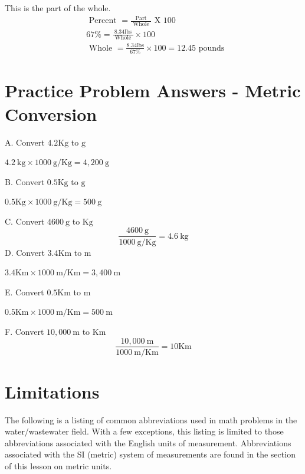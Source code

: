 \documentclass[10pt]{article}
\begin{document}
This is the part of the whole.
$$
\begin{aligned}
&\text { Percent }=\frac{\text { Part }}{\text { Whole }} \text { X } 100 \\
&67 \%=\frac{8.34 \mathrm{lbs}}{\text { Whole }} \times 100 \\
&\text { Whole }=\frac{8.34 \mathrm{lbs}}{67 \%} \times 100=12.45 \text { pounds }
\end{aligned}
$$

\section{Practice Problem Answers - Metric Conversion}
A. Convert $4.2 \mathrm{Kg}$ to $\mathrm{g}$

$4.2 \mathrm{~kg} \times 1000 \mathrm{~g} / \mathrm{Kg}=4,200 \mathrm{~g}$

B. Convert $0.5 \mathrm{Kg}$ to $\mathrm{g}$

$0.5 \mathrm{Kg} \times 1000 \mathrm{~g} / \mathrm{Kg}=500 \mathrm{~g}$

C. Convert $4600 \mathrm{~g}$ to $\mathrm{Kg}$
$$
\frac{4600 \mathrm{~g}}{1000 \mathrm{~g} / \mathrm{Kg}}=4.6 \mathrm{~kg}
$$
D. Convert $3.4 \mathrm{Km}$ to $\mathrm{m}$

$3.4 \mathrm{Km} \times 1000 \mathrm{~m} / \mathrm{Km}=3,400 \mathrm{~m}$

E. Convert $0.5 \mathrm{Km}$ to $\mathrm{m}$

$0.5 \mathrm{Km} \times 1000 \mathrm{~m} / \mathrm{Km}=500 \mathrm{~m}$

F. Convert $10,000 \mathrm{~m}$ to $\mathrm{Km}$
$$
\frac{10,000 \mathrm{~m}}{1000 \mathrm{~m} / \mathrm{Km}}=10 \mathrm{Km}
$$

\section{Limitations}
The following is a listing of common abbreviations used in math problems in the water/wastewater field. With a few exceptions, this listing is limited to those abbreviations associated with the English units of measurement. Abbreviations associated with the SI (metric) system of measurements are found in the section of this lesson on metric units.
\end{document}
